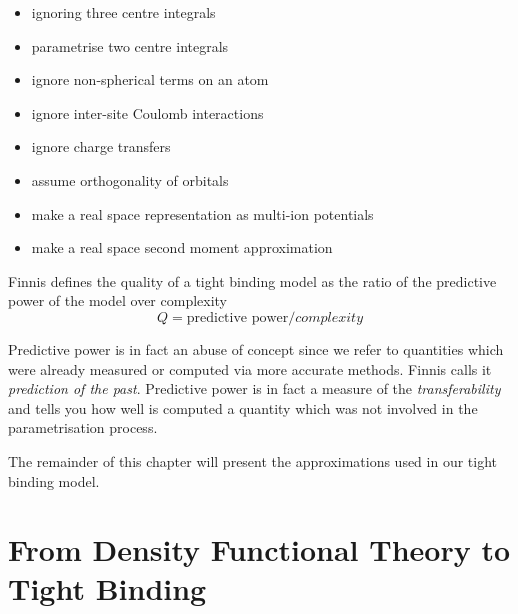 \begin{itemize}
  \item{ignoring three centre integrals}
  \item{parametrise two centre integrals}
  \item{ignore non-spherical terms on an atom}
  \item{ignore inter-site Coulomb interactions}
  \item{ignore charge transfers}
  \item{assume orthogonality of orbitals}
  \item{make a real space representation as multi-ion potentials}
  \item{make a real space second moment approximation}
\end{itemize}
\par{Finnis \citep{Finnis03} defines the quality of a tight binding model as the ratio of the predictive power of the model over complexity}
\begin{equation*}
 Q=\textrm{predictive power}/complexity
\end{equation*}
\par{Predictive power is in fact an abuse of concept since we refer to quantities which were already measured or computed via more accurate methods. Finnis \citep{Finnis03} calls it \emph{prediction of the past}. Predictive power is in fact a measure of the \emph{transferability} and tells you how well is computed a quantity which was not involved in the parametrisation process.}
\par{The remainder of this chapter will present the approximations used in our tight binding model.}
\section{From Density Functional Theory to Tight Binding}

